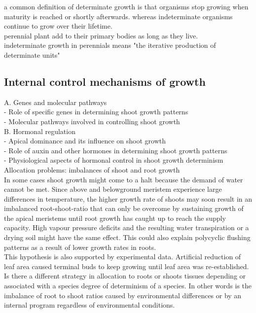 \documentclass{article}
\begin{document}
	a common definition of determinate growth is that organisms stop growing when maturity is reached or shortly afterwards. whereas indeterminate organisms continue to grow over their lifetime.\\
	perennial plant add to their primary bodies as long as they live. \\
	indeterminate growth in perennials means "the iterative production of determinate units"\\
	
	
	\subsection*{Internal control mechanisms of growth}
	A. Genes and molecular pathways\\
	- Role of specific genes in determining shoot growth patterns\\
	- Molecular pathways involved in controlling shoot growth \\
	
	B. Hormonal regulation \\
	- Apical dominance and its influence on shoot growth\\
	- Role of auxin and other hormones in determining shoot growth patterns\\
	- Physiological aspects of hormonal control in shoot growth determinism\\
	
	
	
	Allocation problems: imbalances of shoot and root growth\\
	In some cases shoot growth might come to a halt because the demand of water cannot be met. Since above and belowground meristem experience large differences in temperature, the higher growth rate of shoots may soon result in an imbalanced root-shoot-ratio that can only be overcome by sustaining growth of the apical meristems until root growth has caught up to reach the supply capacity. High vapour pressure deficits and the resulting water transpiration or a drying soil might have the same effect. This could also explain polycyclic flushing patterns as a result of lower growth rates in roots.\\
	This hypothesis is also supported by experimental data. Artificial reduction of leaf area caused terminal buds to keep growing until leaf area was re-established.
	Is there a different strategy in allocation to roots or shoots tissues depending or associated with a species degree of determinism of a species. In other words is the imbalance of root to shoot ratios caused by environmental differences or by an internal program regardless of environmental conditions. \\
	
\end{document}
